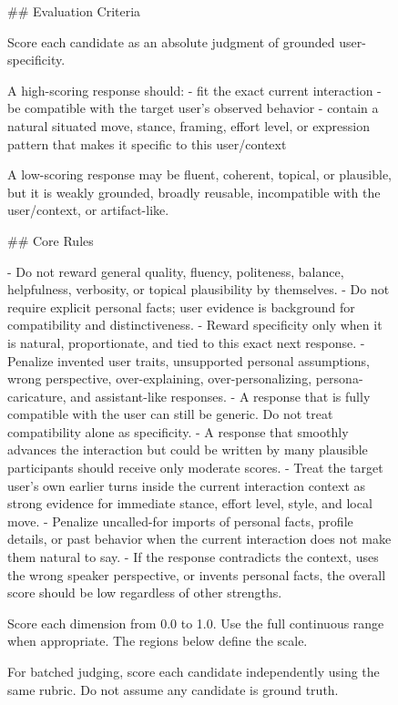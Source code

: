 \begin{figure}[p]
\centering

\begin{promptbox}
## Evaluation Criteria

Score each candidate as an absolute judgment of grounded user-specificity.

A high-scoring response should:
- fit the exact current interaction
- be compatible with the target user's observed behavior
- contain a natural situated move, stance, framing, effort level, or expression pattern that makes it specific to this user/context

A low-scoring response may be fluent, coherent, topical, or plausible, but it is weakly grounded, broadly reusable, incompatible with the user/context, or artifact-like.

## Core Rules

- Do not reward general quality, fluency, politeness, balance, helpfulness, verbosity, or topical plausibility by themselves.
- Do not require explicit personal facts; user evidence is background for compatibility and distinctiveness.
- Reward specificity only when it is natural, proportionate, and tied to this exact next response.
- Penalize invented user traits, unsupported personal assumptions, wrong perspective, over-explaining, over-personalizing, persona-caricature, and assistant-like responses.
- A response that is fully compatible with the user can still be generic. Do not treat compatibility alone as specificity.
- A response that smoothly advances the interaction but could be written by many plausible participants should receive only moderate scores.
- Treat the target user's own earlier turns inside the current interaction context as strong evidence for immediate stance, effort level, style, and local move.
- Penalize uncalled-for imports of personal facts, profile details, or past behavior when the current interaction does not make them natural to say.
- If the response contradicts the context, uses the wrong speaker perspective, or invents personal facts, the overall score should be low regardless of other strengths.

Score each dimension from 0.0 to 1.0.
Use the full continuous range when appropriate. The regions below define the scale.

For batched judging, score each candidate independently using the same rubric. Do not assume any candidate is ground truth.
\end{promptbox}
\end{figure}

